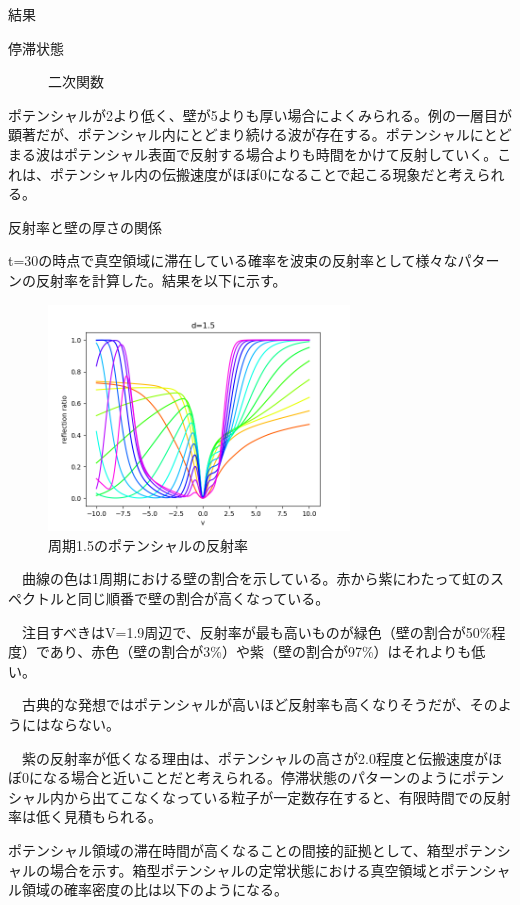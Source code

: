 \documentclass[a4paper, lualatex]{bxjsarticle}
\begin{document}
\begin{section}{結果}
\begin{subsection}{停滞状態}
\begin{figure}[h]
\begin{minipage}{0.5\hsize}
                \caption{二次関数}
            \end{minipage}
        \end{figure}
    \par ポテンシャルが2より低く、壁が5よりも厚い場合によくみられる。例の一層目が顕著だが、ポテンシャル内にとどまり続ける波が存在する。ポテンシャルにとどまる波はポテンシャル表面で反射する場合よりも時間をかけて反射していく。これは、ポテンシャル内の伝搬速度がほぼ0になることで起こる現象だと考えられる。
    \end{subsection}
\newpage
    \begin{subsection}{反射率と壁の厚さの関係}
        \par t=30の時点で真空領域に滞在している確率を波束の反射率として様々なパターンの反射率を計算した。結果を以下に示す。
        \begin{figure}[h]
            \centering
            \includegraphics[width=8cm]{hansha.png}
            \caption{周期1.5のポテンシャルの反射率}
        \end{figure}
    \par　曲線の色は1周期における壁の割合を示している。赤から紫にわたって虹のスペクトルと同じ順番で壁の割合が高くなっている。
    \par　注目すべきはV=1.9周辺で、反射率が最も高いものが緑色（壁の割合が50\%程度）であり、赤色（壁の割合が3\%）や紫（壁の割合が97\%）はそれよりも低い。
    \par　古典的な発想ではポテンシャルが高いほど反射率も高くなりそうだが、そのようにはならない。
\newpage
    \par　紫の反射率が低くなる理由は、ポテンシャルの高さが2.0程度と伝搬速度がほぼ0になる場合と近いことだと考えられる。停滞状態のパターンのようにポテンシャル内から出てこなくなっている粒子が一定数存在すると、有限時間での反射率は低く見積もられる。
    \par ポテンシャル領域の滞在時間が高くなることの間接的証拠として、箱型ポテンシャルの場合を示す。箱型ポテンシャルの定常状態における真空領域とポテンシャル領域の確率密度の比は以下のようになる。

\end{subsection}
\end{section}
\end{document}
